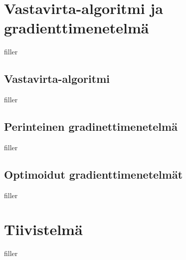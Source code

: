 \documentclass{article}
\begin{document}
\section{Vastavirta-algoritmi ja gradienttimenetelmä}

filler

\subsection{Vastavirta-algoritmi}

filler

\subsection{Perinteinen gradinettimenetelmä}

filler

\subsection{Optimoidut gradienttimenetelmät}

filler

\section{Tiivistelmä}

filler

\printbibliography
\end{document}
